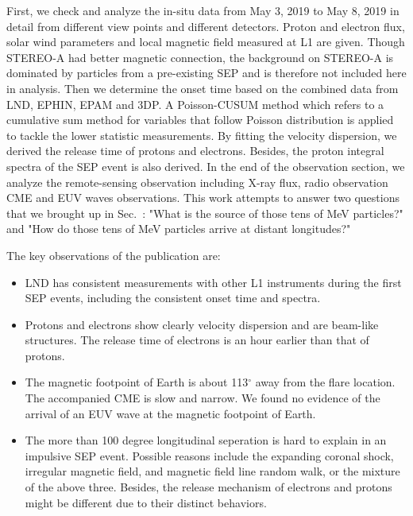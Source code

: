First, we check and analyze the in-situ data from May 3, 2019 to May 8, 2019 in detail from different view points and different detectors. Proton and electron flux, solar wind parameters and local magnetic field measured at \ac{L1} are given.
Though \ac{STEREO}-A had better magnetic connection, the background on \ac{STEREO}-A is dominated by particles from a pre-existing \ac{SEP} and is therefore not included here in analysis.
Then we determine the onset time based on the combined data from \ac{LND}, \ac{EPHIN}, \ac{EPAM} and \acs{3DP}. A Poisson-CUSUM method \citep{Huttunen2005AA, Palmroos2022FrASS} which refers to a cumulative sum method for variables that follow Poisson distribution is applied to tackle the lower statistic measurements. By fitting the velocity dispersion, we derived the release time of protons and electrons. Besides, the proton integral spectra of the \ac{SEP} event is also derived. In the end of the observation section, we analyze the remote-sensing observation including X-ray flux, radio observation \ac{CME} and EUV waves observations. This work attempts to answer two questions that we brought up in Sec.~: "What is the source of those tens of MeV particles?" and "How do those tens of MeV particles arrive at distant longitudes?"


The key observations of the publication are:
\begin{itemize}
    \item \ac{LND} has consistent measurements with other \ac{L1} instruments during the first \ac{SEP} events, including the consistent onset time and spectra.
    \item Protons and electrons show clearly velocity dispersion and are beam-like structures. The release time of electrons is an hour earlier than that of protons.
    \item The magnetic footpoint of Earth is about 113$^\circ$ away from the flare location. The accompanied \ac{CME} is slow and narrow. We found no evidence of the arrival of an EUV wave at the magnetic footpoint of Earth. 
    \item The more than 100 degree longitudinal seperation is hard to explain in an impulsive \ac{SEP} event. Possible reasons include the expanding coronal shock, irregular magnetic field, and magnetic field line random walk, or the mixture of the above three. Besides, the release mechanism of electrons and protons might be different due to their distinct behaviors.
\end{itemize}


